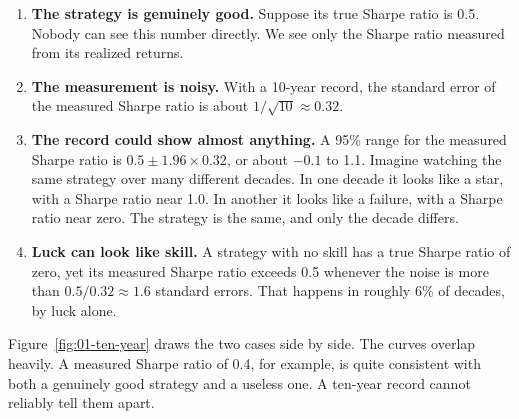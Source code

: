 \begin{enumerate}
  \item \textbf{The strategy is genuinely good.} Suppose its true Sharpe ratio is 0.5. Nobody can see this number directly. We see only the Sharpe ratio measured from its realized returns.
  \item \textbf{The measurement is noisy.} With a 10-year record, the standard error of the measured Sharpe ratio is about $1/\sqrt{10} \approx 0.32$.
  \item \textbf{The record could show almost anything.} A 95\% range for the measured Sharpe ratio is $0.5 \pm 1.96 \times 0.32$, or about $-0.1$ to 1.1. Imagine watching the same strategy over many different decades. In one decade it looks like a star, with a Sharpe ratio near 1.0. In another it looks like a failure, with a Sharpe ratio near zero. The strategy is the same, and only the decade differs.
  \item \textbf{Luck can look like skill.} A strategy with no skill has a true Sharpe ratio of zero, yet its measured Sharpe ratio exceeds 0.5 whenever the noise is more than $0.5/0.32 \approx 1.6$ standard errors. That happens in roughly 6\% of decades, by luck alone.
\end{enumerate}

Figure~\ref{fig:01-ten-year} draws the two cases side by side. The curves overlap heavily. A measured Sharpe ratio of 0.4, for example, is quite consistent with both a genuinely good strategy and a useless one. A ten-year record cannot reliably tell them apart.


